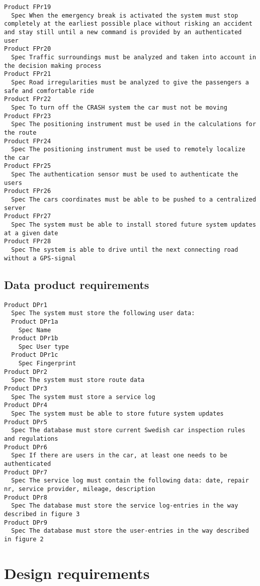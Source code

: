 \begin{lstlisting}
Product FPr19
  Spec When the emergency break is activated the system must stop completely at the earliest possible place without risking an accident and stay still until a new command is provided by an authenticated user
Product FPr20
  Spec Traffic surroundings must be analyzed and taken into account in the decision making process
Product FPr21
  Spec Road irregularities must be analyzed to give the passengers a safe and comfortable ride
Product FPr22
  Spec To turn off the CRASH system the car must not be moving
Product FPr23
  Spec The positioning instrument must be used in the calculations for the route
Product FPr24
  Spec The positioning instrument must be used to remotely localize the car
Product FPr25
  Spec The authentication sensor must be used to authenticate the users
Product FPr26
  Spec The cars coordinates must be able to be pushed to a centralized server
Product FPr27
  Spec The system must be able to install stored future system updates at a given date
Product FPr28
  Spec The system is able to drive until the next connecting road without a GPS-signal

\end{lstlisting}


       \subsection{Data product requirements}


\begin{lstlisting}
Product DPr1
  Spec The system must store the following user data:
  Product DPr1a
    Spec Name
  Product DPr1b
    Spec User type
  Product DPr1c
    Spec Fingerprint
Product DPr2
  Spec The system must store route data
Product DPr3
  Spec The system must store a service log
Product DPr4
  Spec The system must be able to store future system updates
Product DPr5
  Spec The database must store current Swedish car inspection rules and regulations
Product DPr6
  Spec If there are users in the car, at least one needs to be authenticated
Product DPr7
  Spec The service log must contain the following data: date, repair nr, service provider, mileage, description
Product DPr8
  Spec The database must store the service log-entries in the way described in figure 3
Product DPr9
  Spec The database must store the user-entries in the way described in figure 2

\end{lstlisting}


       \section{Design requirements}


